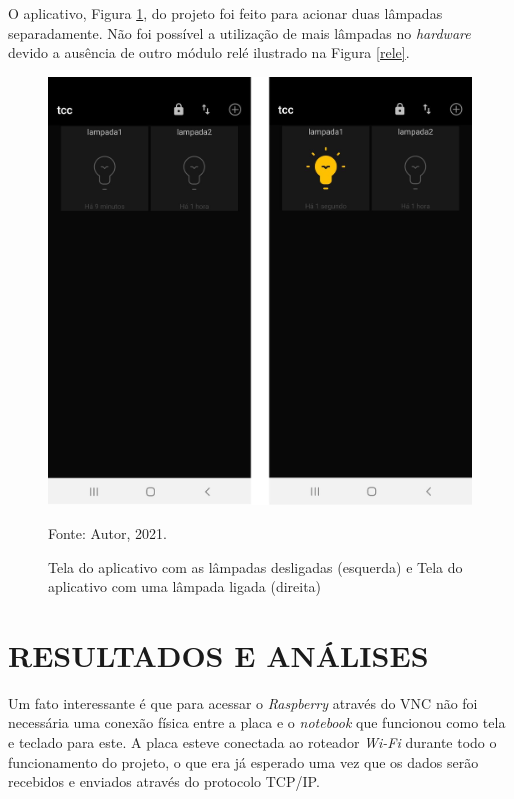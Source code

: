\documentclass[
12pt,
openany, %
oneside, %
a4paper,			
english,			
brazil			        %
]{abntbibufjf}
\begin{document}
	O aplicativo, Figura \ref{app}, do projeto foi feito para acionar duas lâmpadas separadamente. Não foi possível a utilização de mais lâmpadas no \textit{hardware} devido a ausência de outro módulo relé ilustrado na Figura \ref{rele}. 
	
	\begin{figure}[!htb]
		\centering
		\includegraphics[scale=0.3]{Figuras/app.jpeg}
		\caption{Tela do aplicativo com as lâmpadas desligadas (esquerda) e Tela do aplicativo com uma lâmpada ligada (direita)}
		\label{app}
		\par Fonte: Autor, 2021.
	\end{figure}
	
	

	\chapter{RESULTADOS E ANÁLISES}
	
	Um fato interessante é que para acessar o \textit{Raspberry} através do VNC não foi necessária uma conexão física entre a placa e o \textit{notebook} que funcionou como tela e teclado para este. A placa esteve conectada ao roteador \textit{Wi-Fi} durante todo o funcionamento do projeto, o que era já esperado uma vez que os dados serão recebidos e enviados através do protocolo TCP/IP.
	
\end{document}
